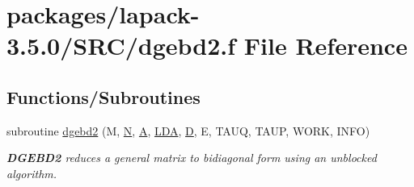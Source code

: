 \hypertarget{dgebd2_8f}{}\section{packages/lapack-\/3.5.0/\+S\+R\+C/dgebd2.f File Reference}
\label{dgebd2_8f}
\subsection*{Functions/\+Subroutines}
\begin{DoxyCompactItemize}
\item 
subroutine \hyperlink{group__doubleGEcomputational_ga14ddd93ddf8aa38daf5a0ce1f6052ce3}{dgebd2} (M, \hyperlink{polmisc_8c_a0240ac851181b84ac374872dc5434ee4}{N}, \hyperlink{classA}{A}, \hyperlink{example__user_8c_ae946da542ce0db94dced19b2ecefd1aa}{L\+D\+A}, \hyperlink{odrpack_8h_a7dae6ea403d00f3687f24a874e67d139}{D}, E, T\+A\+U\+Q, T\+A\+U\+P, W\+O\+R\+K, I\+N\+F\+O)
\begin{DoxyCompactList}\small\item\em {\bfseries D\+G\+E\+B\+D2} reduces a general matrix to bidiagonal form using an unblocked algorithm. \end{DoxyCompactList}\end{DoxyCompactItemize}
